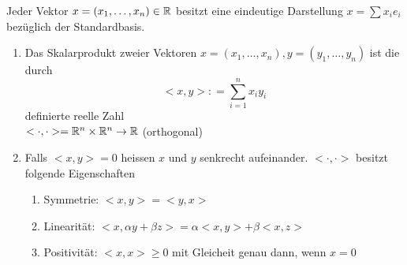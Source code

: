 Jeder Vektor $x=\left(x_1,\dots,x_n \right)\in\mathbb{R}$ besitzt eine eindeutige Darstellung $x=\sum x_ie_i$ bezüglich der Standardbasis.
\begin{definition}{2.16}
\begin{enumerate}
\item Das Skalarprodukt zweier Vektoren $x=\left(x_1,\dots,x_n \right),y=\left(y_1,\dots,y_n \right)$ ist die durch \[ < x,y > : = \sum\limits_{i = 1}^n {{x_i}{y_i}} \] definierte reelle Zahl\\ $<\cdot,\cdot>=\mathbb{R}^n\times\mathbb{R}^n\to\mathbb{R}$ (orthogonal)
\item Falls $<x,y>=0$ heissen $x$ und $y$ senkrecht aufeinander. $<\cdot,\cdot>$ besitzt folgende Eigenschaften
\begin{enumerate}
\item Symmetrie: $<x,y>=<y,x>$
\item Linearität: $<x,\alpha y+\beta z>=\alpha <x,y>+\beta <x,z>$
\item Positivität: $<x,x>\geq 0$ mit Gleicheit genau dann, wenn $x=0$
\end{enumerate}
\end{enumerate}
\end{definition}

